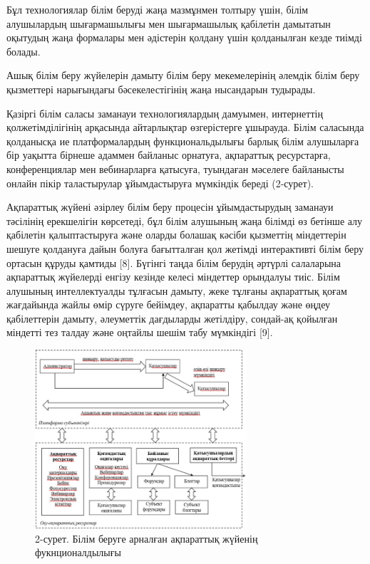 \begin{multicols}{2}
Бұл технологиялар білім беруді жаңа мазмұнмен толтыру үшін, білім
алушылардың шығармашылығы мен шығармашылық қабілетін дамытатын оқытудың
жаңа формалары мен әдістерін қолдану үшін қолданылған кезде тиімді
болады.

Ашық білім беру жүйелерін дамыту білім беру мекемелерінің әлемдік білім
беру қызметтері нарығындағы бәсекелестігінің жаңа нысандарын тудырады.

Қазіргі білім саласы заманауи технологиялардың дамуымен, интернеттің
қолжетімділігінің арқасында айтарлықтар өзгерістерге ұшырауда. Білім
саласында қолданысқа ие платформалардың функциональдылығы барлық білім
алушыларға бір уақытта бірнеше адаммен байланыс орнатуға, ақпараттық
ресурстарға, конференциялар мен вебинарларға қатысуға, туындаған
мәселеге байланысты онлайн пікір таластырулар ұйымдастыруға мүмкіндік
береді (2-сурет).

Ақпараттық жүйені әзірлеу білім беру процесін ұйымдастырудың заманауи
тәсілінің ерекшелігін көрсетеді, бұл білім алушының жаңа білімді өз
бетінше алу қабілетін қалыптастыруға және оларды болашақ кәсіби
қызметтің міндеттерін шешуге қолдануға дайын болуға бағытталған қол
жетімді интерактивті білім беру ортасын құруды қамтиды {[}8{]}. Бүгінгі
таңда білім берудің әртүрлі салаларына ақпараттық жүйелерді енгізу
кезінде келесі міндеттер орындалуы тиіс. Білім алушының интеллектуалды
тұлғасын дамыту, жеке тұлғаны ақпараттық қоғам жағдайында жайлы өмір
сүруге бейімдеу, ақпаратты қабылдау және өңдеу қабілеттерін дамыту,
әлеуметтік дағдыларды жетілдіру, сондай-ақ қойылған міндетті тез талдау
және оңтайлы шешім табу мүмкіндігі {[}9{]}.
\end{multicols}

\begin{figure}[H]
	\centering
	\includegraphics[width=0.7\textwidth]{media/ict/image100}
	\caption*{2-сурет. Білім беруге арналған ақпараттық жүйенің
фукнционалдылығы}
\end{figure}

